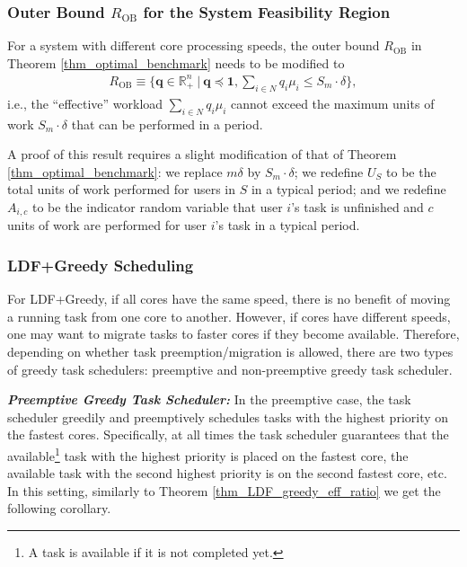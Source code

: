 \documentclass[prodmode,acmtompecs]{acmsmall}
\newcommand{\reqvec}{\mathbf{q}}
\newcommand{\fullUserSet}{N}
\begin{document}
\subsubsection{Outer Bound $R_\text{OB}$ for the System Feasibility Region}

For a system with different core processing speeds, the outer bound $R_\text{OB}$ in Theorem \ref{thm_optimal_benchmark} needs to be modified to
\begin{align*}
R_{\text{OB}} \equiv \{ \reqvec \in \mathbb R^n_+ ~|~ \reqvec \preceq \mathbf{1}, \sum\limits_{i\in \fullUserSet} q_i\mu_i \leq  S_m \cdot \delta\},  
\end{align*}
i.e., the ``effective'' workload $\sum\limits_{i\in \fullUserSet} q_i\mu_i$ cannot exceed the maximum units of work $S_m \cdot \delta$ that can be performed in a period. 

A proof of this result requires a slight modification of that of Theorem \ref{thm_optimal_benchmark}: we replace $m\delta$ by $S_m \cdot \delta$; we redefine $U_S$ to be the total units of work performed for users in $S$ in a typical period; and we redefine $A_{i, c}$ to be the indicator random variable that user $i$'s task is unfinished and $c$ units of work are performed for user $i$'s task in a typical period. 

\subsubsection{LDF+Greedy Scheduling}

For LDF+Greedy, if all cores have the same speed, there is no benefit of moving a running task from one core to another. 
However, if cores have different speeds, one may want to migrate tasks to faster cores if they become available. 
Therefore, depending on whether task preemption/migration is allowed, there are two types of greedy task schedulers: 
preemptive and non-preemptive greedy task scheduler. 

{\bf \em Preemptive Greedy Task Scheduler: }
In the preemptive case, the task scheduler greedily and preemptively schedules tasks with the highest priority on the fastest cores. Specifically, at all times the task scheduler guarantees that the available\footnote{A task is available if it is not completed yet. } task with the highest priority is placed on the fastest core, the available task with the second highest priority is on the second fastest core, etc. 
In this setting, similarly to Theorem \ref{thm_LDF_greedy_eff_ratio} we get the following corollary. 
\end{document}
